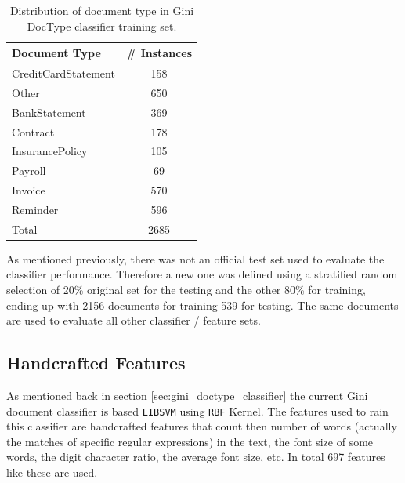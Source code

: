 \begin{table}[h]

  \centering
  \caption{Distribution of document type in  Gini \ac{DocType} classifier training set.}
  \label{tab:doctype_classifier_classes}

\small
\begin{tabular}{|l|c|}
\hline
 \textbf{Document Type}    &  \textbf{\# Instances}  \\
\hline
 CreditCardStatement  &           158  \\
 Other                &           650  \\
 BankStatement        &           369  \\
 Contract             &           178  \\  
 InsurancePolicy      &           105  \\
 Payroll              &            69  \\
 Invoice              &           570  \\
 Reminder             &           596  \\
\hline
 Total                &          2685  \\
\hline
\end{tabular}
\end{table}

As  mentioned previously, there was not an official test set used to
evaluate the classifier performance. Therefore a new one was defined using a
stratified random selection of 20\% original  set for the testing and the
other 80\% for training, ending up with 2156 documents for training  539 for
testing. The same documents are used to evaluate all other classifier /
feature sets.


\subsection{Handcrafted Features}
\label{sec:sub_w2v4tc_current_features}

As mentioned back in section  \ref{sec:gini_doctype_classifier} the current
Gini document classifier is based  \texttt{LIBSVM} \cite{CC01a} using 
\texttt{RBF} Kernel.   The features used to rain this classifier are
handcrafted features that count then number of words (actually the matches of
specific regular expressions) in the text, the font size of some
words, the digit character ratio, the average font size, etc. In total 697 features like these are used.
 


